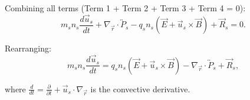 Combining all terms (Term 1 + Term 2 + Term 3 + Term 4 = 0):
\begin{equation*}
m_s n_s \frac{d\vec{u}_s}{dt} + \nabla_{\vec{r}} \cdot \overleftrightarrow{P}_s - q_s n_s (\vec{E} + \vec{u}_s \times \vec{B}) + \vec{R}_s = 0.
\end{equation*}

Rearranging:
\begin{equation*}
 m_s n_s \frac{d\vec{u}_s}{dt} = q_s n_s (\vec{E} + \vec{u}_s \times \vec{B}) - \nabla_{\vec{r}} \cdot \overleftrightarrow{P}_s + \vec{R}_s,
\end{equation*}

where $\frac{d}{dt} = \frac{\partial}{\partial t} + \vec{u}_s \cdot \nabla_{\vec{r}}$ is the convective derivative.
